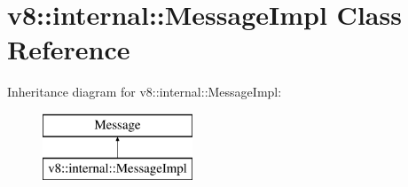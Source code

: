 \hypertarget{classv8_1_1internal_1_1_message_impl}{}\section{v8\+:\+:internal\+:\+:Message\+Impl Class Reference}
\label{classv8_1_1internal_1_1_message_impl}
Inheritance diagram for v8\+:\+:internal\+:\+:Message\+Impl\+:\begin{figure}[H]
\begin{center}
\leavevmode
\includegraphics[height=2.000000cm]{classv8_1_1internal_1_1_message_impl}
\end{center}
\end{figure}
